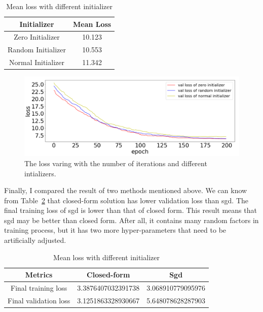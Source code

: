 \documentclass[journal, a4paper]{IEEEtran}
\begin{document}
	\begin{table}[!hbt]
		\begin{center}
		\caption{Mean loss with different initializer}
		\label{tab:lossInitial1}
		\begin{tabular}{|c|c|}
			\hline
			Initializer & Mean Loss \\
			\hline
			Zero Initializer & 10.123 \\
			\hline
			Random Initializer & 10.553 \\
			\hline
			Normal Initializer & 11.342 \\
			\hline
		\end{tabular}
		\end{center}
	\end{table}

	\begin{figure}[!hbt]
		\begin{center}
		\includegraphics[width=\columnwidth]{sgd2}
		\caption{The loss varing with the number of iterations and different intializers.}
		\label{fig:sgd2}
		\end{center}
	\end{figure}
	
Finally, I compared the result of two methods mentioned above. We can know from Table~\ref{tab:loss} that closed-form solution has lower  validation loss than sgd. The final training loss of sgd is lower than that of closed form. This result means that sgd may be better than closed form. After all, it contains many random factors in training process, but it has two more hyper-parameters that need to be artificially adjusted.

	\begin{table}[!hbt]
		\begin{center}
		\caption{Mean loss with different initializer}
		\label{tab:loss}
		\begin{tabular}{|c|c|c|}
			\hline
			Metrics & Closed-form & Sgd \\
			\hline
			Final training loss & 3.3876407032391738 & 3.068910779095976 \\
			\hline
			Final validation loss & 3.1251863328930667 & 5.648078628287903\\
			\hline
		\end{tabular}
		\end{center}
	\end{table}
\end{document}
